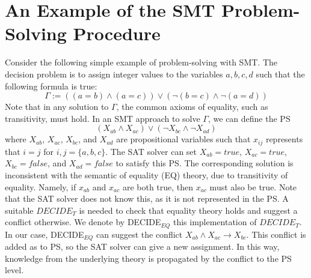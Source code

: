 \documentclass[review]{elsarticle}
\newcommand{\decidet}{\ensuremath{\mathit{DECIDE_T}}\xspace}
\newcommand{\smt}{\ac{SMT}\xspace}
\newcommand{\csipp}{\ac{CSIPP}\xspace}
\newcommand{\ps}{\ac{PS}\xspace}
\begin{document}

\appendix

\section{An Example of the \smt Problem-Solving Procedure}
\label{sec:smt-example}
Consider the following simple example of problem-solving with \smt. 
The decision problem is to assign integer values to the variables 
$a,b,c,d$ such that the following formula is true: 
\begin{equation}
\Gamma := ((a = b) \wedge (a=c)) \vee (\neg(b = c) \wedge \neg(a=d))
\end{equation}
Note that in any solution to $\Gamma$, the common axioms of equality, such as transitivity, must hold. 
In an \smt approach to solve $\Gamma$, we can define the \ps  
\begin{equation}
 (X_{ab} \wedge X_{ac}) \vee (\neg X_{bc} \wedge \neg X_{ad})   
\end{equation}
where $X_{ab}$, $X_{ac}$, $X_{bc}$, and $X_{ad}$ are propositional variables such that $x_{ij}$ represents that $i=j$ for $i,j=\{a,b,c\}$. 
The SAT solver can set $X_{ab}=true$, $X_{ac}=true$, $X_{bc}=false$, and $X_{ad}=false$ to satisfy this \ps. %
The corresponding solution is inconsistent with the semantic of equality (EQ) theory, due to transitivity of equality. Namely, if $x_{ab}$ and $x_{ac}$ are both true, then $x_{ac}$ must also be true. Note that the SAT solver does not know this, as it is not represented in the \ps. A suitable \decidet is needed to check that equality theory holds and suggest a conflict otherwise. We denote by DECIDE$_{EQ}$ this implementation of \decidet. 
In our case, DECIDE$_{EQ}$ can suggest the conflict $X_{ab} \wedge X_{ac} \rightarrow X_{bc}$. This conflict is added as to \ps, so the SAT solver can give a new assignment. %
In this way, knowledge from the underlying theory is propagated by the conflict to the \ps level.
\end{document}
